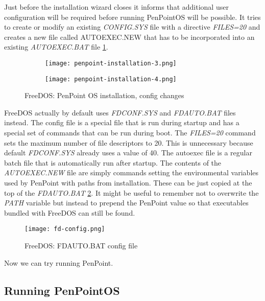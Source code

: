 Just before the installation wizard closes it informs that additional user
configuration will be required before running PenPointOS will be possible. It
tries to create or modify an existing \emph{CONFIG.SYS} file with a directive
\emph{FILES=20} and creates a new file called AUTOEXEC.NEW that has to be
incorporated into an existing \emph{AUTOEXEC.BAT} file
\ref{fig:penpoint-installation-2}.

\begin{figure}[H]
    \centering
    \begin{subfigure}[b]{0.45\linewidth}
        \texttt{[image: penpoint-installation-3.png]}
    \end{subfigure}
    \hfill
    \begin{subfigure}[b]{0.45\linewidth}
        \texttt{[image: penpoint-installation-4.png]}
    \end{subfigure}
    \caption{FreeDOS: PenPoint OS installation, config changes}
    \label{fig:penpoint-installation-2}
\end{figure}

FreeDOS actually by default uses \emph{FDCONF.SYS} and \emph{FDAUTO.BAT} files
instead. The config file is a special file that is run during startup and has
a special set of commands that can be run during boot. The \emph{FILES=20}
command sets the maximum number of file descriptors to 20. This is unnecessary
because default \emph{FDCONF.SYS} already uses a value of 40. The autoexec file
is a regular batch file that is automatically run after startup. The contents
of the \emph{AUTOEXEC.NEW} file are simply commands setting the environmental
variables used by PenPoint with paths from installation. These can be just
copied at the top of the \emph{FDAUTO.BAT} \ref{fig:fd-config}. It might be
useful to remember not to overwrite the \emph{PATH} variable but instead to
prepend the PenPoint value so that executables bundled with FreeDOS can still
be found.

\begin{figure}[H]
    \centering
    \texttt{[image: fd-config.png]}
    \caption{FreeDOS: FDAUTO.BAT config file}
    \label{fig:fd-config}
\end{figure}

Now we can try running PenPoint.

\subsection{Running PenPointOS}

